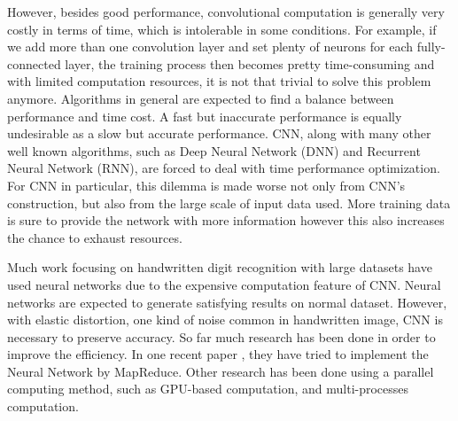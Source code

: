 However, besides good performance, convolutional computation is generally very costly in terms of time, which is intolerable in some conditions. For example, if we add more than one convolution layer and set plenty of neurons for each fully-connected layer, the training process then becomes pretty time-consuming and with limited computation resources, it is not that trivial to solve this problem anymore.
Algorithms in general are expected to find a balance between performance and time cost. A fast but inaccurate performance is equally undesirable as a slow but accurate performance. CNN, along with many other well known algorithms, such as Deep Neural Network (DNN) and Recurrent Neural Network (RNN), are forced to deal with time performance optimization.
For CNN in particular, this dilemma is made worse not only from CNN's construction, but also from the large scale of input data used. More training data is sure to provide the network with more information however this also increases the chance to exhaust resources.

Much work focusing on handwritten digit recognition with large datasets have used neural networks \cite{sun2015large} due to the expensive computation feature of CNN. Neural networks are expected to generate satisfying results on normal dataset. However, with elastic distortion, one kind of noise common in handwritten image, CNN is necessary to preserve accuracy. 
So far much research has been done in order to improve the efficiency. In one recent paper \cite{sun2015large}, they have tried to implement the Neural Network by MapReduce. Other research has been done using a parallel computing method, such as GPU-based computation, and multi-processes computation.  


